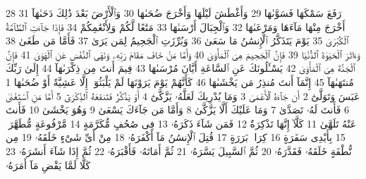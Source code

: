 {\tiny\colorbox{cl_aya}{28}} رَفَعَ سَمْكَهَا فَسَوَّىٰهَا
{\tiny\colorbox{cl_aya}{29}} وَأَغْطَشَ لَيْلَهَا وَأَخْرَجَ ضُحَىٰهَا
{\tiny\colorbox{cl_aya}{30}} وَٱلْأَرْضَ بَعْدَ ذَٰلِكَ دَحَىٰهَآ
{\tiny\colorbox{cl_aya}{31}} أَخْرَجَ مِنْهَا مَآءَهَا وَمَرْعَىٰهَا
{\tiny\colorbox{cl_aya}{32}} وَٱلْجِبَالَ أَرْسَىٰهَا
{\tiny\colorbox{cl_aya}{33}} مَتَٰعًا لَّكُمْ وَلِأَنْعَٰمِكُمْ
{\tiny\colorbox{cl_aya}{34}} فَإِذَا جَآءَتِ ٱلطَّآمَّةُ ٱلْكُبْرَىٰ
{\tiny\colorbox{cl_aya}{35}} يَوْمَ يَتَذَكَّرُ ٱلْإِنسَٰنُ مَا سَعَىٰ
{\tiny\colorbox{cl_aya}{36}} وَبُرِّزَتِ ٱلْجَحِيمُ لِمَن يَرَىٰ
{\tiny\colorbox{cl_aya}{37}} فَأَمَّا مَن طَغَىٰ
{\tiny\colorbox{cl_aya}{38}} وَءَاثَرَ ٱلْحَيَوٰةَ ٱلدُّنْيَا
{\tiny\colorbox{cl_aya}{39}} فَإِنَّ ٱلْجَحِيمَ هِىَ ٱلْمَأْوَىٰ
{\tiny\colorbox{cl_aya}{40}} وَأَمَّا مَنْ خَافَ مَقَامَ رَبِّهِۦ وَنَهَى ٱلنَّفْسَ عَنِ ٱلْهَوَىٰ
{\tiny\colorbox{cl_aya}{41}} فَإِنَّ ٱلْجَنَّةَ هِىَ ٱلْمَأْوَىٰ
{\tiny\colorbox{cl_aya}{42}} يَسْـَٔلُونَكَ عَنِ ٱلسَّاعَةِ أَيَّانَ مُرْسَىٰهَا
{\tiny\colorbox{cl_aya}{43}} فِيمَ أَنتَ مِن ذِكْرَىٰهَآ
{\tiny\colorbox{cl_aya}{44}} إِلَىٰ رَبِّكَ مُنتَهَىٰهَآ
{\tiny\colorbox{cl_aya}{45}} إِنَّمَآ أَنتَ مُنذِرُ مَن يَخْشَىٰهَا
{\tiny\colorbox{cl_aya}{46}} كَأَنَّهُمْ يَوْمَ يَرَوْنَهَا لَمْ يَلْبَثُوٓا۟ إِلَّا عَشِيَّةً أَوْ ضُحَىٰهَا
{\tiny\colorbox{cl_aya}{1}} عَبَسَ وَتَوَلَّىٰٓ
{\tiny\colorbox{cl_aya}{2}} أَن جَآءَهُ ٱلْأَعْمَىٰ
{\tiny\colorbox{cl_aya}{3}} وَمَا يُدْرِيكَ لَعَلَّهُۥ يَزَّكَّىٰٓ
{\tiny\colorbox{cl_aya}{4}} أَوْ يَذَّكَّرُ فَتَنفَعَهُ ٱلذِّكْرَىٰٓ
{\tiny\colorbox{cl_aya}{5}} أَمَّا مَنِ ٱسْتَغْنَىٰ
{\tiny\colorbox{cl_aya}{6}} فَأَنتَ لَهُۥ تَصَدَّىٰ
{\tiny\colorbox{cl_aya}{7}} وَمَا عَلَيْكَ أَلَّا يَزَّكَّىٰ
{\tiny\colorbox{cl_aya}{8}} وَأَمَّا مَن جَآءَكَ يَسْعَىٰ
{\tiny\colorbox{cl_aya}{9}} وَهُوَ يَخْشَىٰ
{\tiny\colorbox{cl_aya}{10}} فَأَنتَ عَنْهُ تَلَهَّىٰ
{\tiny\colorbox{cl_aya}{11}} كَلَّآ إِنَّهَا تَذْكِرَةٌ
{\tiny\colorbox{cl_aya}{12}} فَمَن شَآءَ ذَكَرَهُۥ
{\tiny\colorbox{cl_aya}{13}} فِى صُحُفٍ مُّكَرَّمَةٍ
{\tiny\colorbox{cl_aya}{14}} مَّرْفُوعَةٍ مُّطَهَّرَةٍۭ
{\tiny\colorbox{cl_aya}{15}} بِأَيْدِى سَفَرَةٍ
{\tiny\colorbox{cl_aya}{16}} كِرَامٍۭ بَرَرَةٍ
{\tiny\colorbox{cl_aya}{17}} قُتِلَ ٱلْإِنسَٰنُ مَآ أَكْفَرَهُۥ
{\tiny\colorbox{cl_aya}{18}} مِنْ أَىِّ شَىْءٍ خَلَقَهُۥ
{\tiny\colorbox{cl_aya}{19}} مِن نُّطْفَةٍ خَلَقَهُۥ فَقَدَّرَهُۥ
{\tiny\colorbox{cl_aya}{20}} ثُمَّ ٱلسَّبِيلَ يَسَّرَهُۥ
{\tiny\colorbox{cl_aya}{21}} ثُمَّ أَمَاتَهُۥ فَأَقْبَرَهُۥ
{\tiny\colorbox{cl_aya}{22}} ثُمَّ إِذَا شَآءَ أَنشَرَهُۥ
{\tiny\colorbox{cl_aya}{23}} كَلَّا لَمَّا يَقْضِ مَآ أَمَرَهُۥ
